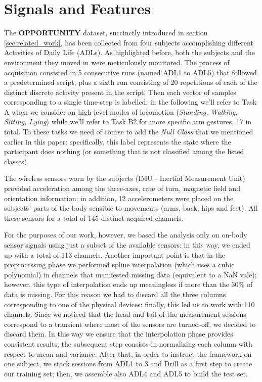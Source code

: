 \section{Signals and Features}
\label{sec:model}

The \textbf{OPPORTUNITY} dataset, succinctly introduced in section \ref{sec:related_work}, has been collected from four subjects accomplishing different Activities of Daily Life (ADLs). As highlighted before, both the subjects and the environment they moved in were meticulously monitored.
The process of acquisition consisted in 5 consecutive runs (named ADL1 to ADL5) that followed a predetermined script, plus a sixth run consisting of 20 repetitions of each of the distinct discrete activity present in the script. Then each vector of samples corresponding to a single time-step is labelled; in the following we'll refer to Task A when we consider an high-level modes of locomotion (\textit{Standing, Walking, Sitting, Lying}) while we'll refer to Task B2 for more specific arm gestures, 17 in total. To these tasks we need of course to add the \textit{Null Class} that we mentioned earlier in this paper: specifically, this label represents the state where the participant does nothing (or something that is not classified among the listed classes). 

The wireless sensors worn by the subjects (IMU - Inertial Measurement Unit) provided acceleration among the three-axes, rate of turn, magnetic field and orientation information; in addition, 12 accelerometers were placed on the subjects' parts of the body sensible to movements (arms, back, hips and feet). All these sensors for a total of 145 distinct acquired channels. 

For the purposes of our work, however, we based the analysis only on on-body sensor signals using just a subset of the available sensors: in this way, we ended up with a total of 113 channels. Another important point is that in the preprocessing phase we performed spline interpolation (which uses a cubic polynomial) in channels that manifested missing data (equivalent to a NaN vale); however, this type of interpolation ends up meaningless if more than the 30\% of data is missing. For this reason we had to discard all the three columns corresponding to one of the physical devices: finally, this led us to work with 110 channels. Since we noticed that the head and tail of the measurement sessions correspond to a transient where most of the sensors are turned-off, we decided to discard them. In this way we ensure that the interpolation phase provides consistent results; the subsequent step consists in normalizing each column with respect to mean and variance. After that, in order to instruct the framework on one subject, we stack sessions from ADL1 to 3 and Drill as a first step to create our training set; then, we assemble also ADL4 and ADL5 to build the test set. 

